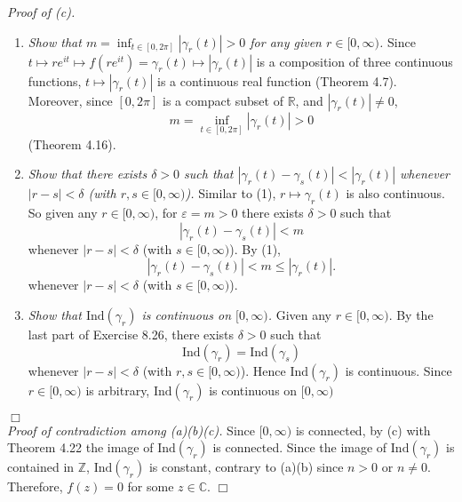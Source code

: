 \documentclass{article}
\begin{document}
\emph{Proof of (c).}
\begin{enumerate}
  \item[(1)]
  \emph{Show that $m = \inf_{t \in [0, 2\pi]} |\gamma_r(t)| > 0$
  for any given $r \in [0,\infty)$.}
  Since
  $t \mapsto re^{it} \mapsto f(re^{it}) = \gamma_r(t) \mapsto |\gamma_r(t)|$
  is a composition of three continuous functions,
  $t \mapsto |\gamma_r(t)|$ is a continuous real function (Theorem 4.7).
  Moreover, since $[0,2\pi]$ is a compact subset of $\mathbb{R}$,
  and $|\gamma_r(t)| \neq 0$,
  \[
    m = \inf_{t \in [0, 2\pi]} |\gamma_r(t)| > 0
  \]
  (Theorem 4.16).

  \item[(2)]
  \emph{Show that there exists $\delta > 0$ such that
  $|\gamma_r(t) - \gamma_s(t)| < |\gamma_r(t)|$
  whenever $|r-s| < \delta$ (with $r, s \in [0,\infty)$).}
  Similar to (1), $r \mapsto \gamma_r(t)$ is also continuous.
  So given any $r \in [0,\infty)$,
  for $\varepsilon = m > 0$ there exists $\delta > 0$
  such that
  \[
    |\gamma_r(t) - \gamma_s(t)| < m
  \]
  whenever $|r-s| < \delta$ (with $s \in [0,\infty)$).
  By (1),
  \[
    |\gamma_r(t) - \gamma_s(t)| < m \leq |\gamma_r(t)|.
  \]
  whenever $|r-s| < \delta$ (with $s \in [0,\infty)$).

  \item[(3)]
  \emph{Show that $\mathrm{Ind}(\gamma_r)$ is continuous on $[0,\infty)$.}
  Given any $r \in [0,\infty)$.
  By the last part of Exercise 8.26, there exists $\delta > 0$ such that
  \[
    \mathrm{Ind}(\gamma_r) = \mathrm{Ind}(\gamma_s)
  \]
  whenever $|r-s| < \delta$ (with $r, s \in [0,\infty)$).
  Hence $\mathrm{Ind}(\gamma_r)$ is continuous.
  Since $r \in [0,\infty)$ is arbitrary,
  $\mathrm{Ind}(\gamma_r)$ is continuous on $[0,\infty)$
\end{enumerate}
$\Box$ \\



\emph{Proof of contradiction among (a)(b)(c).}
Since $[0,\infty)$ is connected, by (c) with Theorem 4.22
the image of $\mathrm{Ind}(\gamma_r)$ is connected.
Since the image of $\mathrm{Ind}(\gamma_r)$ is contained in $\mathbb{Z}$,
$\mathrm{Ind}(\gamma_r)$ is constant, contrary to (a)(b) since $n > 0$ or $n \neq 0$.
Therefore, $f(z) = 0$ for some $z \in \mathbb{C}$.
$\Box$ \\\\



\end{document}

